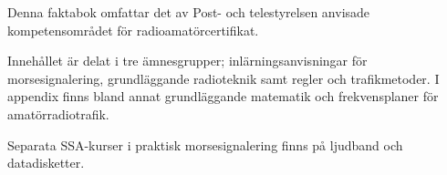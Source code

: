 \onecolumn

Denna faktabok omfattar det av Post- och telestyrelsen anvisade kompetensområdet för radioamatörcertifikat.

Innehållet är delat i tre ämnesgrupper; inlärningsanvisningar för morsesignalering, grundläggande radioteknik samt regler och trafikmetoder. I appendix finns bland annat grundläggande matematik och frekvensplaner för amatörradiotrafik.

Separata SSA-kurser i praktisk morsesignalering finns på ljudband och datadisketter.

\twocolumn